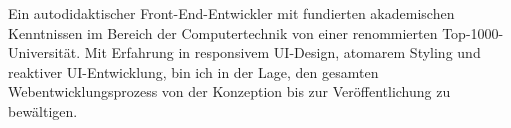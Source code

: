 
\begin{cvparagraph}
Ein autodidaktischer Front-End-Entwickler mit fundierten akademischen Kenntnissen 
im Bereich der Computertechnik von einer renommierten Top-1000-Universität.
Mit Erfahrung in responsivem UI-Design, atomarem Styling und reaktiver UI-Entwicklung,
bin ich in der Lage, den gesamten Webentwicklungsprozess von 
der Konzeption bis zur Veröffentlichung zu bewältigen.
\end{cvparagraph}

